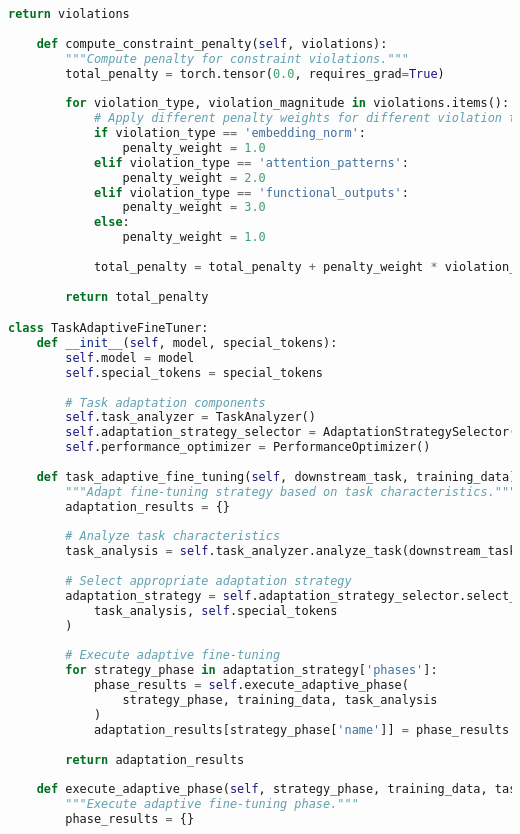 \begin{lstlisting}[language=Python, caption=Function-preserving fine-tuning framework]
        return violations
    
    def compute_constraint_penalty(self, violations):
        """Compute penalty for constraint violations."""
        total_penalty = torch.tensor(0.0, requires_grad=True)
        
        for violation_type, violation_magnitude in violations.items():
            # Apply different penalty weights for different violation types
            if violation_type == 'embedding_norm':
                penalty_weight = 1.0
            elif violation_type == 'attention_patterns':
                penalty_weight = 2.0
            elif violation_type == 'functional_outputs':
                penalty_weight = 3.0
            else:
                penalty_weight = 1.0
            
            total_penalty = total_penalty + penalty_weight * violation_magnitude.pow(2)
        
        return total_penalty

class TaskAdaptiveFineTuner:
    def __init__(self, model, special_tokens):
        self.model = model
        self.special_tokens = special_tokens
        
        # Task adaptation components
        self.task_analyzer = TaskAnalyzer()
        self.adaptation_strategy_selector = AdaptationStrategySelector()
        self.performance_optimizer = PerformanceOptimizer()
        
    def task_adaptive_fine_tuning(self, downstream_task, training_data):
        """Adapt fine-tuning strategy based on task characteristics."""
        adaptation_results = {}
        
        # Analyze task characteristics
        task_analysis = self.task_analyzer.analyze_task(downstream_task, training_data)
        
        # Select appropriate adaptation strategy
        adaptation_strategy = self.adaptation_strategy_selector.select_strategy(
            task_analysis, self.special_tokens
        )
        
        # Execute adaptive fine-tuning
        for strategy_phase in adaptation_strategy['phases']:
            phase_results = self.execute_adaptive_phase(
                strategy_phase, training_data, task_analysis
            )
            adaptation_results[strategy_phase['name']] = phase_results
        
        return adaptation_results
    
    def execute_adaptive_phase(self, strategy_phase, training_data, task_analysis):
        """Execute adaptive fine-tuning phase."""
        phase_results = {}
        

\end{lstlisting}
